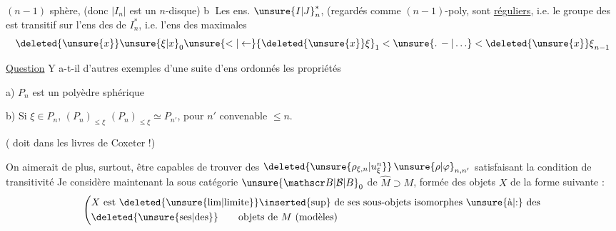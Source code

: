  $(n-1)$ sphère, (donc $|I_n|$ est un $n$-disque)
\textcircled{b} Les ens.  $ {\unsure{I|J}}_n^*$, (regardés comme $(n-1)$-poly, sont \uline{réguliers}, i.e. le groupe des  est transitif sur l'ens des  de $I_n^*$, i.e. l'ens des  maximales
\[
{\deleted{\unsure{x}}\unsure{\xi|x}}_0\unsure{<|\leftarrow}{\deleted{\unsure{x}}\xi}_1<\unsure{.\,-|\ldots}<{\deleted{\unsure{x}}\xi}_{n-1}
\]

\uline{Question} Y a-t-il d'autres exemples d'une suite    d'ens ordonnés  les propriétés

a) $P_n$ est un polyèdre \uline{} sphérique

b) Si $\xi\in P_n$,   $(P_n)_{\leq\xi}$  $(P_n)_{\leq\xi}\simeq P_{n'}$, pour $n'$ convenable $\leq n$.

( doit  dans les livres de Coxeter !)

On aimerait de plus, surtout, être capables de trouver des $\deleted{\unsure{\rho_{\xi,n}|u^n_\xi}}\,{\unsure{\rho|\varphi}}_{n,n'}$ satisfaisant la condition de transitivité
Je considère maintenant la sous catégorie $ {\unsure{\mathscr B|\mathcal B|B}}_0$ de $\widehat M\supset M$, formée des objets $X$ de la forme suivante :
\[
\left(\begin{aligned}
&X\text{ est }\deleted{\text{\unsure{lim|limite}}}\inserted{\text{sup}}\text{ de ses sous-objets isomorphes \unsure{à|:} des}\\
&\deleted{\text{\unsure{ses|des}}}\qquad\text{objets de }M\text{ (modèles)}
\end{aligned}\right.
\]

